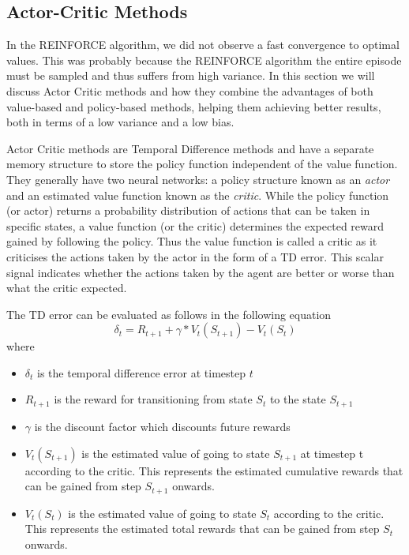 \documentclass{article}
\begin{document}
\subsection{Actor-Critic Methods}
\par In the REINFORCE algorithm, we did not observe a fast convergence to optimal values. This was probably because the REINFORCE algorithm the entire episode must be sampled and thus suffers from high variance. In this section we will discuss Actor Critic methods and how they combine the advantages of both value-based and policy-based methods, helping them achieving better results, both in terms of a low variance and a low bias. 
\par Actor Critic methods are Temporal Difference methods and have a separate memory structure to store the policy function independent of the value function. They generally have two neural networks: a policy structure known as an \emph{actor} and an estimated value function known as the \emph{critic}. While the policy function (or actor) returns a probability distribution of actions that can be taken in specific states, a value function (or the critic) determines the expected reward gained by following the policy. Thus the value function is called a critic as it criticises the actions taken by the actor in the form of a TD error. This scalar signal indicates whether the actions taken by the agent are better or worse than what the critic expected. 
\par The TD error can be evaluated as follows in the following equation
\begin{equation*}
\delta_{t} = R_{t+1} + \gamma * V_t(S_{t+1})-V_t(S_t)
\end{equation*}
 where 
\begin{itemize}[itemsep=0pt]
\renewcommand\labelitemi{.}
\item $\delta_{t}$ is the temporal difference error at timestep $t$
\item $R_{t+1}$ is the reward for transitioning from state $S_t$ to the state $S_{t+1}$
\item $\gamma$ is the discount factor which discounts future rewards
\item $V_t(S_{t+1})$ is the estimated value of going to state $S_{t+1}$ at timestep t according to the critic. This represents the estimated cumulative rewards that can be gained from step $S_{t+1}$ onwards.
\item $V_t(S_t)$ is the estimated value of going to state $S_t$ according to the critic. This represents the estimated total rewards that can be gained from step $S_{t}$ onwards.
\end{itemize}
\end{document}
